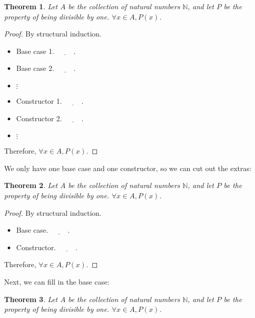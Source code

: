 \documentclass{book}
\numberwithin{equation}{chapter}
\newcommand{\blank}{\underline{\hspace{1cm}}}
\newtheorem*{anon-theorem}{Theorem}
\begin{document}
\noindent
\hrulefill

\begin{anon-theorem}
Let $A$ be the collection of natural numbers $\mathbb{N}$, and let $P$ be the property of being divisible by one. $\forall x \in A, P(x)$.
\end{anon-theorem}

\begin{proof}
By structural induction.

\begin{itemize}
\item{Base case 1. $\blank$.}
\item{Base case 2. $\blank$.}
\item{$\vdots$}
\item{Constructor 1. $\blank$.}
\item{Constructor 2. $\blank$.}
\item{$\vdots$}
\end{itemize}

\noindent
Therefore, $\forall x \in A, P(x)$.
\end{proof}

\noindent
\hrulefill
\newline

\noindent
We only have one base case and one constructor, so we can cut out the extras:

\noindent
\hrulefill

\begin{anon-theorem}
Let $A$ be the collection of natural numbers $\mathbb{N}$, and let $P$ be the property of being divisible by one. $\forall x \in A, P(x)$.
\end{anon-theorem}

\begin{proof}
By structural induction.

\begin{itemize}
\item{Base case. $\blank$.}
\item{Constructor. $\blank$.}
\end{itemize}

\noindent
Therefore, $\forall x \in A, P(x)$.
\end{proof}

\noindent
\hrulefill
\newline

\noindent
Next, we can fill in the base case:

\noindent
\hrulefill

\begin{anon-theorem}
Let $A$ be the collection of natural numbers $\mathbb{N}$, and let $P$ be the property of being divisible by one. $\forall x \in A, P(x)$.
\end{anon-theorem}
\end{document}
